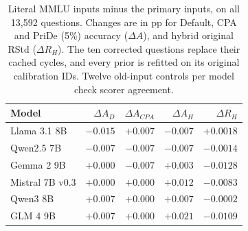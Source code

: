 \begin{table}[htbp]
\centering\small\setlength{\tabcolsep}{4pt}
\caption{Literal MMLU inputs minus the primary inputs, on all 13,592 questions. Changes are in pp for Default, CPA and PriDe (5\%) accuracy ($\Delta A$), and hybrid original RStd ($\Delta R_H$). The ten corrected questions replace their cached cycles, and every prior is refitted on its original calibration IDs. Twelve old-input controls per model check scorer agreement.}
\label{tab:mmlu-repair}
\begin{tabular}{lrrrr}
\toprule
Model & $\Delta A_D$ & $\Delta A_{CPA}$ & $\Delta A_H$ & $\Delta R_H$\\
\midrule
Llama 3.1 8B & $-0.015$ & $+0.007$ & $-0.007$ & $+0.0018$\\
Qwen2.5 7B & $-0.007$ & $-0.007$ & $-0.007$ & $-0.0014$\\
Gemma 2 9B & $+0.000$ & $-0.007$ & $+0.003$ & $-0.0128$\\
Mistral 7B v0.3 & $+0.000$ & $+0.000$ & $+0.012$ & $-0.0083$\\
Qwen3 8B & $+0.007$ & $+0.000$ & $+0.007$ & $-0.0002$\\
GLM 4 9B & $+0.007$ & $+0.000$ & $+0.021$ & $-0.0109$\\
\bottomrule
\end{tabular}
\end{table}

